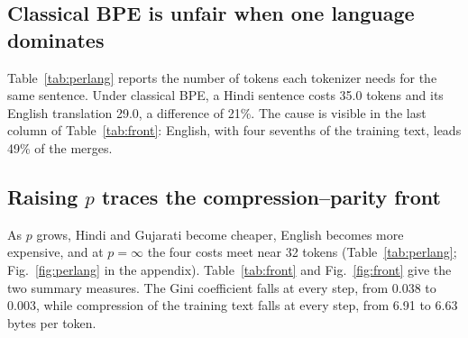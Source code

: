 \subsection{Classical BPE is unfair when one language dominates}

Table~\ref{tab:perlang} reports the number of tokens each tokenizer needs for the same
sentence. Under classical BPE, a Hindi sentence costs 35.0 tokens and its English
translation 29.0, a difference of 21\%. The cause is visible in the last column of
Table~\ref{tab:front}: English, with four sevenths of the training text, leads 49\% of the
merges.

\begin{table}[t]
\centering
\small
{}
\caption{Tokens per sentence on FLORES-200 devtest, mean over five samples of training
text (standard deviations are at most 0.1). ``Max/min'' is the most expensive language
divided by the cheapest.}
\label{tab:perlang}
\end{table}

\subsection{Raising $p$ traces the compression--parity front}

As $p$ grows, Hindi and Gujarati become cheaper, English becomes more expensive, and at
$p=\infty$ the four costs meet near 32 tokens (Table~\ref{tab:perlang};
Fig.~\ref{fig:perlang} in the appendix). Table~\ref{tab:front} and Fig.~\ref{fig:front}
give the two summary measures. The Gini coefficient falls at every step, from 0.038 to
0.003, while compression of the training text falls at every step, from 6.91 to 6.63 bytes
per token.

